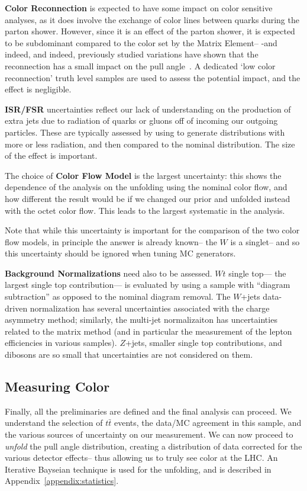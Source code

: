 \textbf{Color Reconnection} is expected to have some impact on color sensitive analyses, as it does involve the exchange of color lines between quarks during the parton shower. However, since it is an effect of the parton shower, it is expected to be subdominant compared to the color set by the Matrix Element-- -and indeed, and indeed, previously studied variations have shown that the reconnection has a small impact on the pull angle~\cite{Altheimer:2013yza}.  A dedicated `low color reconnection' truth level samples are used to assess the potential impact, and the effect is negligible.


	\textbf{ISR/FSR} uncertainties reflect our lack of understanding on the production of extra jets due to radiation of quarks or gluons off of incoming our outgoing particles. These are typically assessed by using \Acermc to generate distributions with more or less radiation, and then compared to the nominal distribution. The size of the effect is important.

	The choice of \textbf{Color Flow Model} is the largest uncertainty: this shows the dependence of the analysis on the unfolding using the nominal color flow, and how different the result would be if we changed our prior and unfolded instead with the octet color flow. This leads to the largest systematic in the analysis.

	Note that while this uncertainty is important for the comparison of the two color flow models, in principle the answer is already known-- the $W$ is a singlet-- and so this uncertainty should be ignored when tuning MC generators.

	\textbf{Background Normalizations} need also to be assessed. $Wt$ single top--- the largest single top contribution--- is evaluated by using a sample with ``diagram subtraction'' as opposed to the nominal diagram removal. The $W$+jets data-driven normalization has several uncertainties associated with the charge asymmetry method; similarly, the multi-jet normalizaiton has uncertainties related to the matrix method (and in particular the measurement of the lepton efficiencies in various samples). $Z$+jets, smaller single top contributions, and dibosons are so small that uncertainties are not considered on them. 


\subsection{Measuring Color}

Finally, all the preliminaries are defined and the final analysis can proceed. We understand the selection of $t\bar{t}$ events, the data/MC agreement in this sample, and the various sources of uncertainty on our measurement. We can now proceed to \textit{unfold} the pull angle distribution, creating a distribution of data corrected for the various detector effects-- thus allowing us to truly see color at the LHC. An Iterative Bayseian technique is used for the unfolding, and is described in Appendix~\ref{appendix:statistics}.
	

